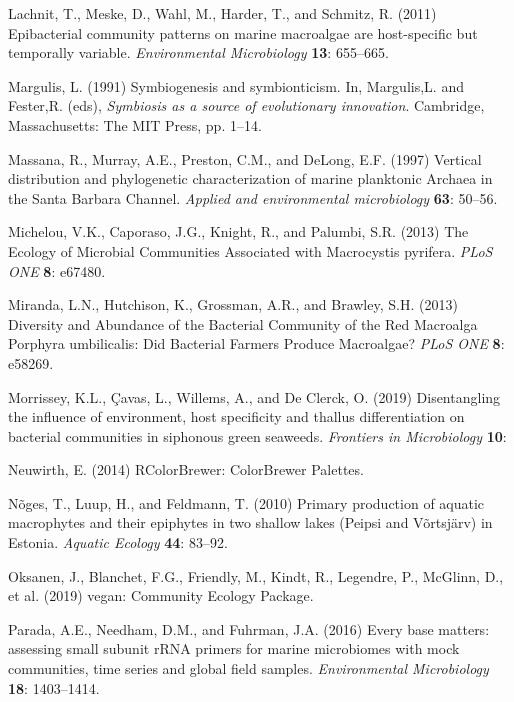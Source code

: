 \documentclass[12pt,]{article}
\begin{document}
\leavevmode\hypertarget{ref-Lachnit2011}{}%
Lachnit, T., Meske, D., Wahl, M., Harder, T., and Schmitz, R. (2011)
Epibacterial community patterns on marine macroalgae are host-specific
but temporally variable. \emph{Environmental Microbiology} \textbf{13}:
655--665.

\leavevmode\hypertarget{ref-Margulis1991}{}%
Margulis, L. (1991) Symbiogenesis and symbionticism. In, Margulis,L. and
Fester,R. (eds), \emph{Symbiosis as a source of evolutionary
innovation}. Cambridge, Massachusetts: The MIT Press, pp. 1--14.

\leavevmode\hypertarget{ref-Massana1997}{}%
Massana, R., Murray, A.E., Preston, C.M., and DeLong, E.F. (1997)
Vertical distribution and phylogenetic characterization of marine
planktonic Archaea in the Santa Barbara Channel. \emph{Applied and
environmental microbiology} \textbf{63}: 50--56.

\leavevmode\hypertarget{ref-Michelou2013}{}%
Michelou, V.K., Caporaso, J.G., Knight, R., and Palumbi, S.R. (2013) The
Ecology of Microbial Communities Associated with Macrocystis pyrifera.
\emph{PLoS ONE} \textbf{8}: e67480.

\leavevmode\hypertarget{ref-Miranda2013}{}%
Miranda, L.N., Hutchison, K., Grossman, A.R., and Brawley, S.H. (2013)
Diversity and Abundance of the Bacterial Community of the Red Macroalga
Porphyra umbilicalis: Did Bacterial Farmers Produce Macroalgae?
\emph{PLoS ONE} \textbf{8}: e58269.

\leavevmode\hypertarget{ref-Morrissey2019}{}%
Morrissey, K.L., Çavas, L., Willems, A., and De Clerck, O. (2019)
Disentangling the influence of environment, host specificity and thallus
differentiation on bacterial communities in siphonous green seaweeds.
\emph{Frontiers in Microbiology} \textbf{10}:

\leavevmode\hypertarget{ref-Neuwirth2014}{}%
Neuwirth, E. (2014) RColorBrewer: ColorBrewer Palettes.

\leavevmode\hypertarget{ref-Noges2010}{}%
Nõges, T., Luup, H., and Feldmann, T. (2010) Primary production of
aquatic macrophytes and their epiphytes in two shallow lakes (Peipsi and
Võrtsjärv) in Estonia. \emph{Aquatic Ecology} \textbf{44}: 83--92.

\leavevmode\hypertarget{ref-Oksanen2019}{}%
Oksanen, J., Blanchet, F.G., Friendly, M., Kindt, R., Legendre, P.,
McGlinn, D., et al. (2019) vegan: Community Ecology Package.

\leavevmode\hypertarget{ref-Parada2016}{}%
Parada, A.E., Needham, D.M., and Fuhrman, J.A. (2016) Every base
matters: assessing small subunit rRNA primers for marine microbiomes
with mock communities, time series and global field samples.
\emph{Environmental Microbiology} \textbf{18}: 1403--1414.
\end{document}
